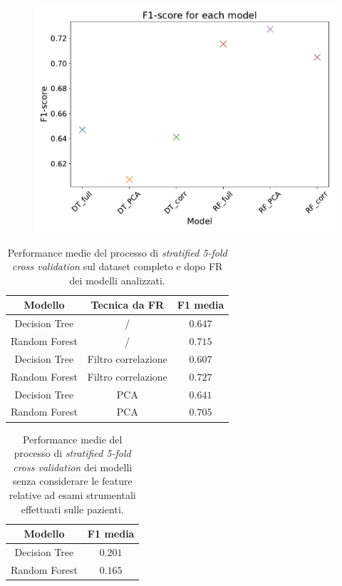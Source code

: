 \begin{figure}
	\centering
	\includegraphics[width=0.8\linewidth]{images/fscore}
	\caption{}
	\label{fig:fscore}
\end{figure}

\begin{table}
\centering
\caption{Performance medie del processo di \textit{stratified 5-fold cross validation} sul dataset completo e dopo FR dei modelli analizzati.}
\label{tab:f1score}
\begin{tabular}{|c|c|c|}
	\toprule
	Modello & Tecnica da FR & F1 media \\ 
	\midrule 
	Decision Tree & / & $0.647$ \\  
	Random Forest & / & $0.715$ \\ 
	Decision Tree & Filtro correlazione & $0.607$ \\ 
	Random Forest & Filtro correlazione & $0.727$ \\ 
	Decision Tree & PCA & $0.641$ \\ 
	Random Forest & PCA & $0.705$ \\ 
	\bottomrule
\end{tabular}
\end{table}

\begin{table}
	\centering
	\caption{Performance medie del processo di \textit{stratified 5-fold cross validation} dei modelli senza considerare le feature relative ad esami strumentali effettuati sulle pazienti.}
	\label{tab:noexamsscore}
	\begin{tabular}{|c|c|}
		\toprule
		Modello & F1 media \\ 
		\midrule 
		Decision Tree & $0.201$ \\  
		Random Forest  & $0.165$ \\ 
		\bottomrule
	\end{tabular}
\end{table}

